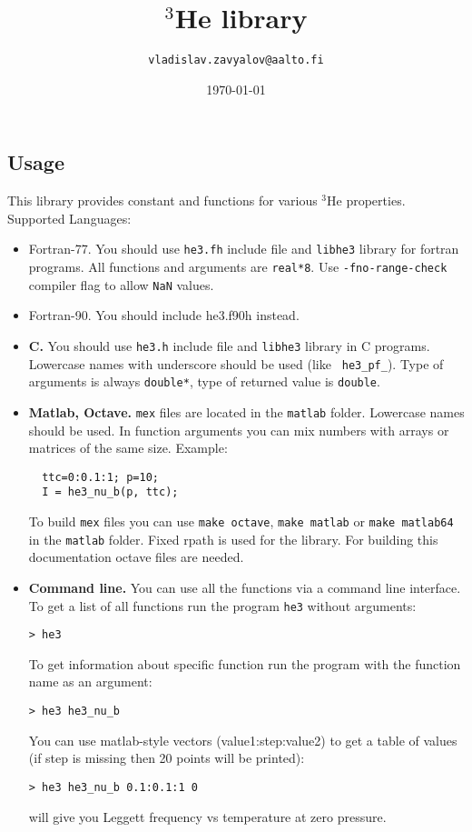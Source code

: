\documentclass[a4paper]{article}
\begin{document}
\title{$^3$He library}
\date{\today}
\author{\tt vladislav.zavyalov@aalto.fi}
\maketitle

\subsection*{Usage}

This library provides constant and functions for various $^3$He properties.
Supported Languages:

\begin{itemize}
\item{Fortran-77.}
You should use {\tt he3.fh} include file and {\tt libhe3} library for
fortran programs. All functions and arguments are {\tt real*8}.
Use {\tt -fno-range-check} compiler flag to allow {\tt NaN} values.

\item{Fortran-90.}
You should include he3.f90h instead.

\item{\bf C.} You should use {\tt he3.h} include file and {\tt libhe3} library
in C programs. Lowercase names with underscore should be used (like {\tt
he3\_pf\_}). Type of arguments is always {\tt double*}, type of returned
value is {\tt double}.

\item{\bf Matlab, Octave.} {\tt mex} files are located in the {\tt matlab}
folder. Lowercase names should be used. In function arguments you can
mix numbers with arrays or matrices of the same size. Example:
\begin{verbatim}
  ttc=0:0.1:1; p=10;
  I = he3_nu_b(p, ttc);
\end{verbatim}
To build {\tt mex} files you can use {\tt make octave}, {\tt make matlab}
or {\tt make matlab64} in the {\tt matlab} folder. Fixed rpath is used
for the library. For building this documentation octave files are needed.


\item{\bf Command line.} You can use all the functions via a command line interface.
To get a list of all functions run the program {\tt he3} without arguments:
\begin{verbatim}
> he3
\end{verbatim}
To get information about specific function run the program with the
function name as an argument:
\begin{verbatim}
> he3 he3_nu_b
\end{verbatim}
You can use matlab-style vectors (value1:step:value2) to get a table
of values (if step is missing then 20 points will be printed):
\begin{verbatim}
> he3 he3_nu_b 0.1:0.1:1 0
\end{verbatim}
will give you Leggett frequency vs temperature at zero pressure.

\end{itemize}
\end{document}
